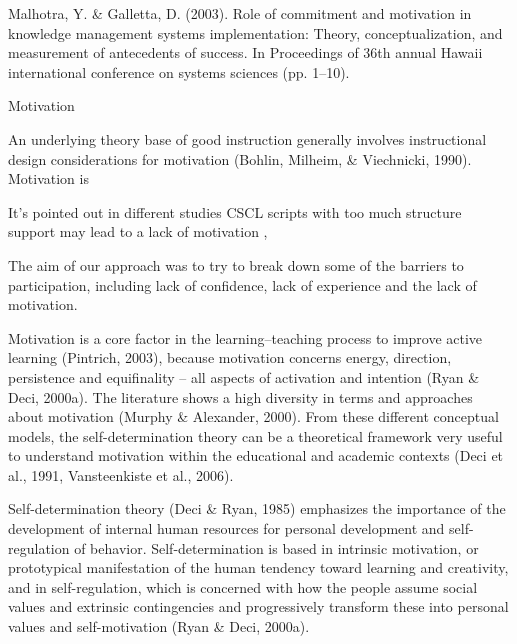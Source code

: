 Malhotra, Y. & Galletta, D. (2003). Role of commitment and motivation in knowledge management systems implementation: Theory, conceptualization, and measurement of antecedents of success. In Proceedings of 36th annual Hawaii international conference on systems sciences (pp. 1–10).







Motivation 


An underlying theory base of good instruction generally involves instructional design considerations for motivation (Bohlin, Milheim, & Viechnicki, 1990). Motivation is 




It's pointed out in different studies 
CSCL scripts with too much structure support may lead to a lack of motivation , 



The aim of our approach was to try to break down some of the barriers to participation, including lack of confidence, lack of experience and the lack of motivation.





Motivation is a core factor in the learning–teaching process to improve active learning (Pintrich, 2003), because motivation concerns energy, direction, persistence and equifinality – all aspects of activation and intention (Ryan & Deci, 2000a). The literature shows a high diversity in terms and approaches about motivation (Murphy & Alexander, 2000). From these different conceptual models, the self-determination theory can be a theoretical framework very useful to understand motivation within the educational and academic contexts (Deci et al., 1991, Vansteenkiste et al., 2006). 

 Self-determination theory (Deci & Ryan, 1985) emphasizes the importance of the development of internal human resources for personal development and self-regulation of behavior. Self-determination is based in intrinsic motivation, or prototypical manifestation of the human tendency toward learning and creativity, and in self-regulation, which is concerned with how the people assume social values and extrinsic contingencies and progressively transform these into personal values and self-motivation (Ryan & Deci, 2000a).


